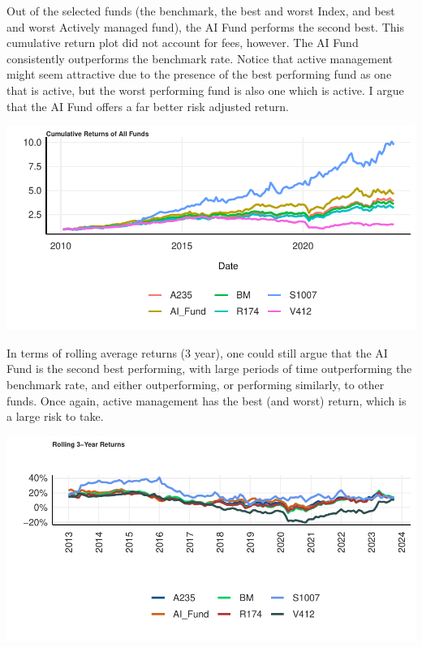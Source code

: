 \documentclass[11pt,preprint, authoryear]{elsarticle}
\let\origfigure\figure
\let\endorigfigure\endfigure
\renewenvironment{figure}[1][2] {
    \expandafter\origfigure\expandafter[H]
} {
    \endorigfigure
}
\numberwithin{equation}{section}
\numberwithin{figure}{section}
\numberwithin{table}{section}
\begin{document}
Out of the selected funds (the benchmark, the best and worst Index, and
best and worst Actively managed fund), the AI Fund performs the second
best. This cumulative return plot did not account for fees, however. The
AI Fund consistently outperforms the benchmark rate. Notice that active
management might seem attractive due to the presence of the best
performing fund as one that is active, but the worst performing fund is
also one which is active. I argue that the AI Fund offers a far better
risk adjusted return.

\begin{figure}[H]

{\centering \includegraphics{Question-1_files/figure-latex/unnamed-chunk-5-1} 

}

\caption{ \label{Figure1.4}}\label{fig:unnamed-chunk-5}
\end{figure}

In terms of rolling average returns (3 year), one could still argue that
the AI Fund is the second best performing, with large periods of time
outperforming the benchmark rate, and either outperforming, or
performing similarly, to other funds. Once again, active management has
the best (and worst) return, which is a large risk to take.

\begin{figure}[H]

{\centering \includegraphics{Question-1_files/figure-latex/unnamed-chunk-6-1} 

}

\caption{ \label{Figure1.5}}\label{fig:unnamed-chunk-6}
\end{figure}
\end{document}

